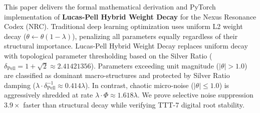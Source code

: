 \begin{abstractbox}
This paper delivers the formal mathematical derivation and PyTorch implementation of \textbf{Lucas-Pell Hybrid Weight Decay} for the Nexus Resonance Codex (NRC). Traditional deep learning optimization uses uniform L2 weight decay ($\theta \leftarrow \theta(1 - \lambda)$), penalizing all parameters equally regardless of their structural importance. Lucas-Pell Hybrid Weight Decay replaces uniform decay with topological parameter thresholding based on the Silver Ratio ($\delta_{\text{Pell}} = 1 + \sqrt{2} \approx 2.41421356$). Parameters exceeding unit magnitude ($|\theta| > 1.0$) are classified as dominant macro-structures and protected by Silver Ratio damping ($\lambda \cdot \delta_{\text{Pell}}^{-1} \approx 0.414 \lambda$). In contrast, chaotic micro-noise ($|\theta| \le 1.0$) is aggressively shredded at rate $\lambda \cdot \Phi \approx 1.618 \lambda$. We prove selective noise suppression $3.9\times$ faster than structural decay while verifying TTT-7 digital root stability.
\end{abstractbox}